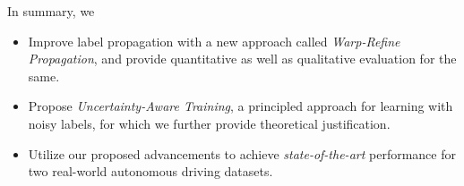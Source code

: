 In summary, we 
\begin{itemize}
    \item Improve label propagation with a new approach called \emph{Warp-Refine Propagation}, and provide quantitative as well as qualitative evaluation for the same. 
    \item Propose \emph{Uncertainty-Aware Training}, a principled approach for learning with noisy labels, for which we further provide theoretical justification.
    \item Utilize our proposed advancements to achieve \textit{state-of-the-art} performance for two real-world autonomous driving datasets.
\end{itemize}



